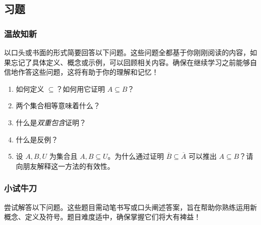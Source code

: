 \subsection{习题}

\subsubsection*{温故知新}

以口头或书面的形式简要回答以下问题。这些问题全都基于你刚刚阅读的内容，如果忘记了具体定义、概念或示例，可以回顾相关内容。确保在继续学习之前能够自信地作答这些问题，这将有助于你的理解和记忆！

\begin{enumerate}[label=(\arabic*)]
    \item 如何定义 $\subseteq$？如何用它证明 $A \subseteq B$？
    \item 两个集合相等意味着什么？
    \item 什么是\emph{双重包含}证明？
    \item 什么是反例？
    \item 设 $A,B,U$ 为集合且 $A,B \subseteq U$。为什么通过证明 $\overline{B} \subseteq \overline{A}$ 可以推出 $A \subseteq B$？请向朋友解释这一方法的有效性。
\end{enumerate}

\subsubsection*{小试牛刀}

尝试解答以下问题。这些题目需动笔书写或口头阐述答案，旨在帮助你熟练运用新概念、定义及符号。题目难度适中，确保掌握它们将大有裨益！

